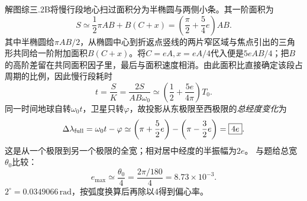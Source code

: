 \documentclass[UTF8,fontset=fandol,a4paper,11pt]{ctexart}
\begin{document}
解图综三.2B将慢行段地心扫过面积分为半椭圆与两侧小条。其一阶面积为
\[
S\simeq\frac12\pi AB+B(C+x)
=\left(\frac\pi2+\frac54e\right)AB.
\]
其中半椭圆给$\pi AB/2$，从椭圆中心到折返点竖线的两片窄区域与焦点引出的三角形共同给一阶附加面积$B(C+x)$。将$C=eA,x=eA/4$代入便是$5eAB/4$；把$B$的高阶差留在共同面积因子里，最后与面积速度相消。由此面积比直接确定该段占周期的比例，因此慢行段耗时
\[
t=\frac SK
=\frac{2S}{AB\omega_0}
\simeq\left(\frac12+\frac{5e}{4\pi}\right)T_0.
\]
同一时间地球自转$\omega_0t$，卫星只转$\varphi$，故投影从东极限至西极限的\emph{总经度变化}为
\[
\Delta\lambda_{\rm full}
=\omega_0t-\varphi
\simeq\left(\pi+\frac52e\right)
-\left(\pi-\frac32e\right)
=\boxed{4e}.
\]
这是从一个极限到另一个极限的全宽；相对居中经度的半振幅为$2e$。
与题给总宽$\theta_0$比较：
\[
\boxed{e_{\max}\simeq\frac{\theta_0}{4}
=\frac{2\pi/180}{4}
=8.73\times10^{-3}}.
\]
$2^\circ=0.0349066\,\mathrm{rad}$，按弧度换算后再除以4得到偏心率。
\end{document}
